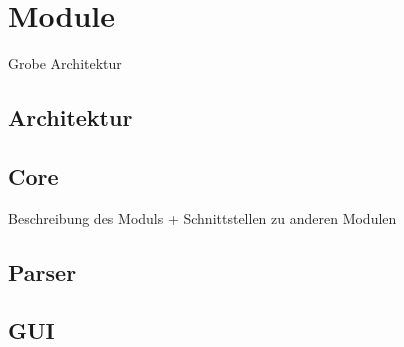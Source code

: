 
\section{Module}

Grobe Architektur

\subsection{Architektur}

\subsection{Core}

Beschreibung des Moduls + Schnittstellen zu anderen Modulen

\subsection{Parser}

\subsection{GUI}
